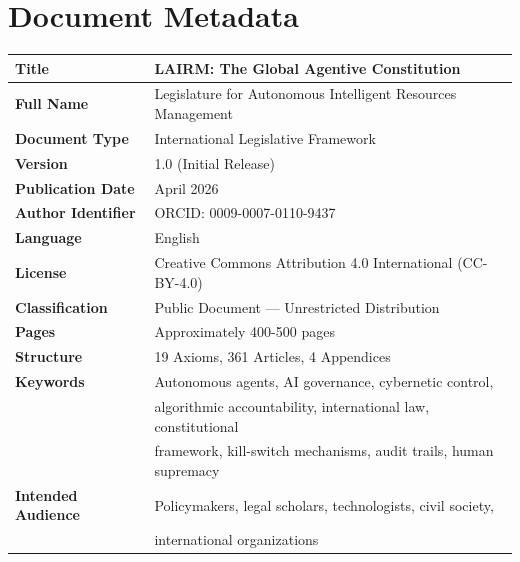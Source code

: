 \documentclass[12pt,a4paper,twoside,openright]{book}
\begin{document}
\cleardoublepage

\chapter*{Document Metadata}

\begin{tabularx}{\textwidth}{@{}lX@{}}
\toprule
\textbf{Title} & LAIRM: The Global Agentive Constitution \\
\midrule
\textbf{Full Name} & Legislature for Autonomous Intelligent Resources Management \\
\midrule
\textbf{Document Type} & International Legislative Framework \\
\midrule
\textbf{Version} & 1.0 (Initial Release) \\
\midrule
\textbf{Publication Date} & April 2026 \\
\midrule
\textbf{Author Identifier} & ORCID: 0009-0007-0110-9437 \\
\midrule
\textbf{Language} & English \\
\midrule
\textbf{License} & Creative Commons Attribution 4.0 International (CC-BY-4.0) \\
\midrule
\textbf{Classification} & Public Document — Unrestricted Distribution \\
\midrule
\textbf{Pages} & Approximately 400-500 pages \\
\midrule
\textbf{Structure} & 19 Axioms, 361 Articles, 4 Appendices \\
\midrule
\textbf{Keywords} & Autonomous agents, AI governance, cybernetic control, \\
& algorithmic accountability, international law, constitutional \\
& framework, kill-switch mechanisms, audit trails, human supremacy \\
\midrule
\textbf{Intended Audience} & Policymakers, legal scholars, technologists, civil society, \\
& international organizations \\
\bottomrule
\end{tabularx}

\cleardoublepage


\end{document}
